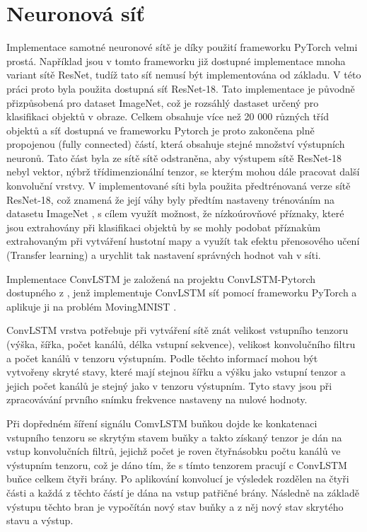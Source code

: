 \section{Neuronová síť}
Implementace samotné neuronové sítě je díky použití frameworku PyTorch velmi prostá.
Například jsou v tomto frameworku již dostupné implementace mnoha variant sítě ResNet, tudíž tato síť nemusí být implementována od základu.
V této práci proto byla použita dostupná síť ResNet-18.
Tato implementace je původně přizpůsobená pro dataset ImageNet, což je rozsáhlý dastaset určený pro klasifikaci objektů v obraze.
Celkem obsahuje více než 20 000 různých tříd objektů a síť dostupná ve frameworku Pytorch je proto zakončena plně propojenou (fully connected) částí, která obsahuje stejné množství výstupních neuronů.
Tato část byla ze sítě sítě odstraněna, aby výstupem sítě ResNet-18 nebyl vektor, nýbrž třídimenzionální tenzor, se kterým mohou dále pracovat další konvoluční vrstvy.
V implementované síti byla použita předtrénovaná verze sítě ResNet-18, což znamená že její váhy byly předtím nastaveny trénováním na datasetu ImageNet \cite{imagenet}, s cílem využít možnost, že nízkoúrovňové příznaky, které jsou extrahovány při klasifikaci objektů by se mohly podobat příznakům extrahovaným při vytváření hustotní mapy a využít tak efektu přenosového učení (Transfer learning) a urychlit tak nastavení správných hodnot vah v síti.

Implementace ConvLSTM je založená na projektu ConvLSTM-Pytorch dostupného z \cite{convlstm_pytorch}, jenž implementuje ConvLSTM síť pomocí frameworku PyTorch a aplikuje ji na problém MovingMNIST \cite{moving_mnist}.

ConvLSTM vrstva potřebuje při vytváření sítě znát velikost vstupního tenzoru (výška, šířka, počet kanálů, délka vstupní sekvence), velikost konvolučního filtru a počet kanálů v tenzoru výstupním.
Podle těchto informací mohou být vytvořeny skryté stavy, které mají stejnou šířku a výšku jako vstupní tenzor a jejich počet kanálů je stejný jako v tenzoru výstupním.
Tyto stavy jsou při zpracovávání prvního snímku frekvence nastaveny na nulové hodnoty.

Při dopředném šíření signálu ComvLSTM buňkou dojde ke konkatenaci vstupního tenzoru se skrytým stavem buňky a takto získaný tenzor je dán na vstup konvolučních filtrů, jejichž počet je roven čtyřnásobku počtu kanálů ve výstupním tenzoru, což je dáno tím, že s tímto tenzorem pracují c ConvLSTM buňce celkem čtyři brány.
Po aplikování konvolucí je výsledek rozdělen na čtyři části a každá z těchto částí je dána na vstup patřičné brány.
Následně na základě výstupu těchto bran je vypočítán nový stav buňky a z něj nový stav skrytého stavu a výstup.

